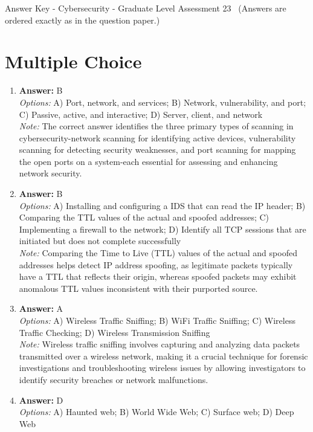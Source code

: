 \documentclass[12pt]{article}
\begin{document}
\begin{center}
Answer Key - Cybersecurity - Graduate Level Assessment 23 \
\small (Answers are ordered exactly as in the question paper.)
\end{center}

\section*{Multiple Choice}
\begin{enumerate}[label=\arabic*.]
\item \textbf{Answer:} B
\\ \textit{Options:} A) Port, network, and services; B) Network, vulnerability, and port; C) Passive, active, and interactive; D) Server, client, and network
\\ \textit{Note:} The correct answer identifies the three primary types of scanning in cybersecurity-network scanning for identifying active devices, vulnerability scanning for detecting security weaknesses, and port scanning for mapping the open ports on a system-each essential for assessing and enhancing network security.
\item \textbf{Answer:} B
\\ \textit{Options:} A) Installing and configuring a IDS that can read the IP header; B) Comparing the TTL values of the actual and spoofed addresses; C) Implementing a firewall to the network; D) Identify all TCP sessions that are initiated but does not complete successfully
\\ \textit{Note:} Comparing the Time to Live (TTL) values of the actual and spoofed addresses helps detect IP address spoofing, as legitimate packets typically have a TTL that reflects their origin, whereas spoofed packets may exhibit anomalous TTL values inconsistent with their purported source.
\item \textbf{Answer:} A
\\ \textit{Options:} A) Wireless Traffic Sniffing; B) WiFi Traffic Sniffing; C) Wireless Traffic Checking; D) Wireless Transmission Sniffing
\\ \textit{Note:} Wireless traffic sniffing involves capturing and analyzing data packets transmitted over a wireless network, making it a crucial technique for forensic investigations and troubleshooting wireless issues by allowing investigators to identify security breaches or network malfunctions.
\item \textbf{Answer:} D
\\ \textit{Options:} A) Haunted web; B) World Wide Web; C) Surface web; D) Deep Web

\end{enumerate}
\end{document}
